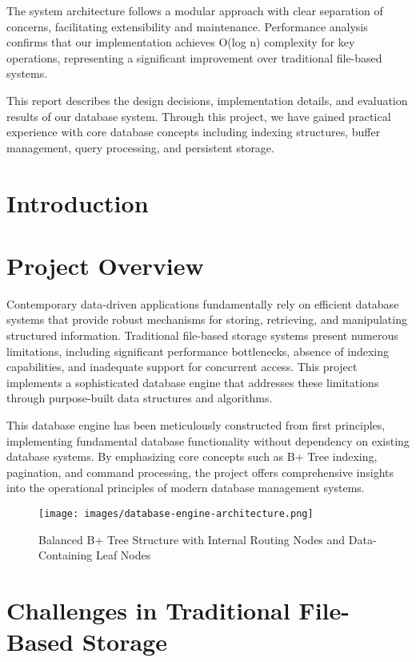 \documentclass[12pt,a4paper]{article}  %
\begin{document}
The system architecture follows a modular approach with clear separation of concerns, facilitating extensibility and maintenance. Performance analysis confirms that our implementation achieves O(log n) complexity for key operations, representing a significant improvement over traditional file-based systems.

This report describes the design decisions, implementation details, and evaluation results of our database system. Through this project, we have gained practical experience with core database concepts including indexing structures, buffer management, query processing, and persistent storage.

\clearpage
{}

\section{Introduction}

\section{Project Overview}
Contemporary data-driven applications fundamentally rely on efficient database systems that provide robust mechanisms for storing, retrieving, and manipulating structured information. Traditional file-based storage systems present numerous limitations, including significant performance bottlenecks, absence of indexing capabilities, and inadequate support for concurrent access. This project implements a sophisticated database engine that addresses these limitations through purpose-built data structures and algorithms.

This database engine has been meticulously constructed from first principles, implementing fundamental database functionality without dependency on existing database systems. By emphasizing core concepts such as B+ Tree indexing, pagination, and command processing, the project offers comprehensive insights into the operational principles of modern database management systems.

\begin{figure}[h]
\centering
\texttt{[image: images/database-engine-architecture.png]}
\caption{Balanced B+ Tree Structure with Internal Routing Nodes and Data-Containing Leaf Nodes}\label{fig:btree_example}
\end{figure}

\section{Challenges in Traditional File-Based Storage}
\end{document}
